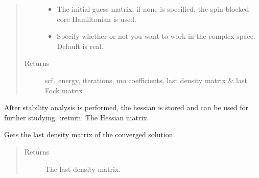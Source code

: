 \documentclass[letterpaper,10pt,english]{sphinxmanual}
\begin{document}
\begin{fulllineitems}
\begin{fulllineitems}
\begin{quote}
\begin{description}
\begin{itemize}
\item {} 
 \textendash{} The initial guess matrix, if none is specified, the spin blocked core Hamiltonian is used.

\item {} 
 \textendash{} Specify whether or not you want to work in the complex space. Default is real.

\end{itemize}

\item[{Returns}] \leavevmode
scf\_energy, iterations, mo coefficients, last density matrix \& last Fock matrix

\end{description}\end{quote}

\end{fulllineitems}


\begin{fulllineitems}
\label{\detokenize{GHF:hf.GHF.GHF.get_hessian}}
After stability analysis is performed, the hessian is stored and can be used for further studying.
:return: The Hessian matrix

\end{fulllineitems}


\begin{fulllineitems}
\label{\detokenize{GHF:hf.GHF.GHF.get_last_dens}}
Gets the last density matrix of the converged solution.
\begin{quote}\begin{description}
\item[{Returns}] \leavevmode
The last density matrix.

\end{description}\end{quote}

\end{fulllineitems}



\end{fulllineitems}
\end{document}
